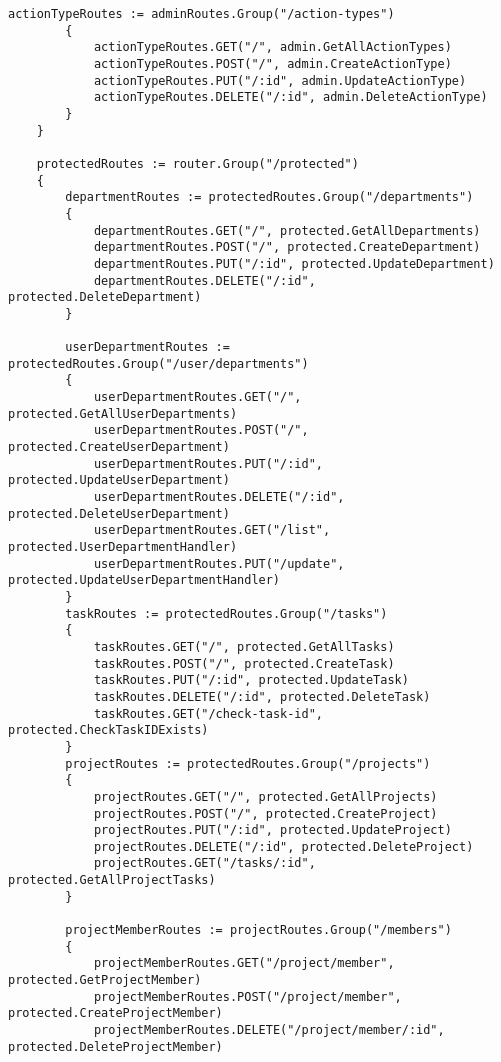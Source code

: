 \begin{lstlisting}[language=Golang, caption=Routes, frame=single]
        actionTypeRoutes := adminRoutes.Group("/action-types")
        {
            actionTypeRoutes.GET("/", admin.GetAllActionTypes)
            actionTypeRoutes.POST("/", admin.CreateActionType)
            actionTypeRoutes.PUT("/:id", admin.UpdateActionType)
            actionTypeRoutes.DELETE("/:id", admin.DeleteActionType)
        }
    }

    protectedRoutes := router.Group("/protected")
    {
        departmentRoutes := protectedRoutes.Group("/departments")
        {
            departmentRoutes.GET("/", protected.GetAllDepartments)
            departmentRoutes.POST("/", protected.CreateDepartment)
            departmentRoutes.PUT("/:id", protected.UpdateDepartment)
            departmentRoutes.DELETE("/:id", protected.DeleteDepartment)
        }

        userDepartmentRoutes := protectedRoutes.Group("/user/departments")
        {
            userDepartmentRoutes.GET("/", protected.GetAllUserDepartments)
            userDepartmentRoutes.POST("/", protected.CreateUserDepartment)
            userDepartmentRoutes.PUT("/:id", protected.UpdateUserDepartment)
            userDepartmentRoutes.DELETE("/:id", protected.DeleteUserDepartment)
            userDepartmentRoutes.GET("/list", protected.UserDepartmentHandler)
            userDepartmentRoutes.PUT("/update", protected.UpdateUserDepartmentHandler)
        }
        taskRoutes := protectedRoutes.Group("/tasks")
        {
            taskRoutes.GET("/", protected.GetAllTasks)
            taskRoutes.POST("/", protected.CreateTask)
            taskRoutes.PUT("/:id", protected.UpdateTask)
            taskRoutes.DELETE("/:id", protected.DeleteTask)
            taskRoutes.GET("/check-task-id", protected.CheckTaskIDExists)
        }
        projectRoutes := protectedRoutes.Group("/projects")
        {
            projectRoutes.GET("/", protected.GetAllProjects)
            projectRoutes.POST("/", protected.CreateProject)
            projectRoutes.PUT("/:id", protected.UpdateProject)
            projectRoutes.DELETE("/:id", protected.DeleteProject)
            projectRoutes.GET("/tasks/:id", protected.GetAllProjectTasks)
        }

        projectMemberRoutes := projectRoutes.Group("/members")
        {
            projectMemberRoutes.GET("/project/member", protected.GetProjectMember)
            projectMemberRoutes.POST("/project/member", protected.CreateProjectMember)
            projectMemberRoutes.DELETE("/project/member/:id", protected.DeleteProjectMember)


\end{lstlisting}
